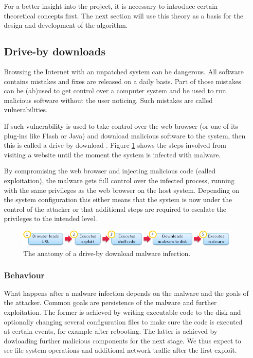 For a better insight into the project, it is necessary to introduce certain theoretical concepts first. The next section will use this theory as a basis for the design and development of the algorithm.

\subsection{Drive-by downloads}

Browsing the Internet with an unpatched system can be dangerous. All software contains mistakes and fixes are released on a daily basis. Part of those mistakes can be (ab)used to get control over a computer system and be used to run malicious software without the user noticing. Such mistakes are called vulnerabilities.

If such vulnerability is used to take control over the web browser (or one of its plug-ins like Flash or Java) and download malicious software to the system, then this is called a drive-by download \cite{Le2013}. Figure \ref{fig:dbdownload} shows the steps involved from visiting a website until the moment the system is infected with malware.

By compromising the web browser and injecting malicious code (called exploitation), the malware gets full control over the infected process, running with the same privileges as the web browser on the host system. Depending on the system configuration this either means that the system is now under the control of the attacker or that additional steps are required to escalate the privileges to the intended level.

\begin{figure}[h]
    \centering
    \includegraphics[width=12cm]{Images/drive-by-download.png}
    \caption{The anatomy of a drive-by download malware infection. \cite{dbdownload-anatomy}}
    \label{fig:dbdownload}
\end{figure}

\subsubsection{Behaviour}
\label{sec:behavior}

What happens after a malware infection depends on the malware and the goals of the attacker. Common goals are persistence of the malware and further exploitation. The former is achieved by writing executable code to the disk and optionally changing several configuration files to make sure the code is executed at certain events, for example after rebooting. The latter is achieved by dowloading further malicious components for the next stage. We thus expect to see file system operations and additional network traffic after the first exploit.

